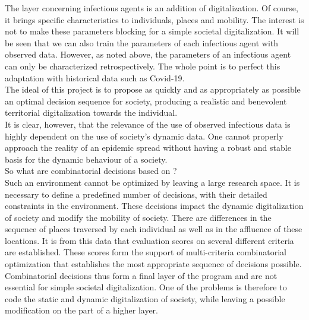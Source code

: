 The layer concerning infectious agents is an addition of digitalization. Of course, it brings specific characteristics to individuals, places and mobility. The interest is not to make these parameters blocking for a simple societal digitalization. It will be seen that we can also train the parameters of each infectious agent with observed data. However, as noted above, the parameters of an infectious agent can only be characterized retrospectively. The whole point is to perfect this adaptation with historical data such as Covid-19.\\

The ideal of this project is to propose as quickly and as appropriately as possible an optimal decision sequence for society, producing a realistic and benevolent territorial digitalization towards the individual.\\

It is clear, however, that the relevance of the use of observed infectious data is highly dependent on the use of society's dynamic data. One cannot properly approach the reality of an epidemic spread without having a robust and stable basis for the dynamic behaviour of a society.\\

So what are combinatorial decisions based on ?\\

Such an environment cannot be optimized by leaving a large research space. It is necessary to define a predefined number of decisions, with their detailed constraints in the environment. These decisions impact the dynamic digitalization of society and modify the mobility of society. There are differences in the sequence of places traversed by each individual as well as in the affluence of these locations. It is from this data that evaluation scores on several different criteria are established. These scores form the support of multi-criteria combinatorial optimization that establishes the most appropriate sequence of decisions possible.\\

Combinatorial decisions thus form a final layer of the program and are not essential for simple societal digitalization. One of the problems is therefore to code the static and dynamic digitalization of society, while leaving a possible modification on the part of a higher layer.\\

\newpage

